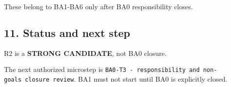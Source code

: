 \documentclass[
  10pt,
  a4paper,
]{article}
\begin{document}
These belong to BA1-BA6 only after BA0 responsibility closes.

\subsection{11. Status and next step}\label{11-status-and-next-step}

R2 is a \textbf{STRONG CANDIDATE}, not BA0 closure.

The next authorized microstep is
\texttt{BA0-T3\ -\ responsibility\ and\ non-goals\ closure\ review}. BA1
must not start until BA0 is explicitly closed.
\end{document}
